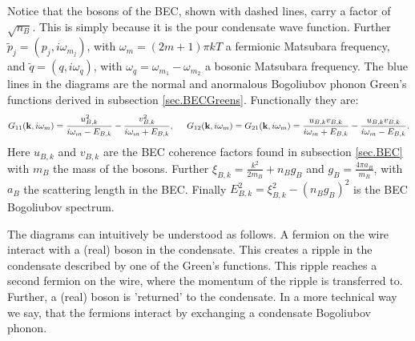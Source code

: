 Notice that the bosons of the BEC, shown with dashed lines, carry a factor of $\sqrt{n_B}$. This is simply because it is the pour condensate wave function. Further $\tilde{p}_j = (p_j, i\omega_{m_j})$, with $\omega_{m} = (2m+1)\pi kT$ a fermionic Matsubara frequency, and $\tilde{q} = (q, i\omega_q )$, with $\omega_q = \omega_{m_1}-\omega_{m_2}$ a bosonic Matsubara frequency. The blue lines in the diagrams are the normal and anormalous Bogoliubov phonon Green's functions derived in subsection \ref{sec.BECGreens}. Functionally they are:
\begin{equation}
G_{11}(\mathbf{k},i\omega_m) = \frac{u_{B,k}^2}{i\omega_m-E_{B,k}}-\frac{v_{B,k}^2}{i\omega_m+E_{B,k}}, \hspace{0.5cm} G_{12}(\mathbf{k},i\omega_m) = G_{21}(\mathbf{k},i\omega_m) = \frac{u_{B,k}v_{B,k}}{i\omega_m+E_{B,k}}-\frac{u_{B,k}v_{B,k}}{i\omega_m-E_{B,k}}.\nonumber
\end{equation}
Here $u_{B,k}$ and $v_{B,k}$ are the BEC coherence factors found in subsection \ref{sec.BEC} with $m_B$ the mass of the bosons. Further $\xi_{B,k} = \frac{k^2}{2m_B}+n_Bg_B$ and $g_B = \frac{4\pi a_B}{m_B}$, with $a_B$ the scattering length in the BEC. Finally $E_{B,k}^2 = \xi_{B,k}^2-(n_Bg_B)^2$ is the BEC Bogoliubov spectrum.

The diagrams can intuitively be understood as follows. A fermion on the wire interact with a (real) boson in the condensate. This creates a ripple in the condensate described by one of the Green's functions. This ripple reaches a second fermion on the wire, where the momentum of the ripple is transferred to. Further, a (real) boson is 'returned' to the condensate. In a more technical way we say, that the fermions interact by exchanging a condensate Bogoliubov phonon. 


